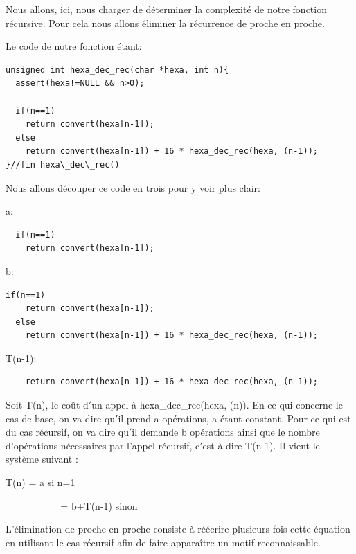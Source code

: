 \documentclass[a4paper, 11pt, oneside]{article}
\begin{document}
Nous allons, ici, nous charger de déterminer la complexité de notre fonction 
récursive. Pour cela nous allons éliminer la récurrence de proche en proche.

Le code de notre fonction étant:
\begin{lstlisting}
unsigned int hexa_dec_rec(char *hexa, int n){
  assert(hexa!=NULL && n>0);

  if(n==1)
    return convert(hexa[n-1]);
  else
    return convert(hexa[n-1]) + 16 * hexa_dec_rec(hexa, (n-1));
}//fin hexa\_dec\_rec()
\end{lstlisting}
\vspace{0.5cm}

Nous allons découper ce code en trois pour y voir plus clair:

\begin{center}
    a:
\end{center}
\begin{lstlisting}
  if(n==1)
    return convert(hexa[n-1]);
\end{lstlisting}

\begin{center}
    b:
\end{center}
\begin{lstlisting}
if(n==1)
    return convert(hexa[n-1]);
  else
    return convert(hexa[n-1]) + 16 * hexa_dec_rec(hexa, (n-1));
\end{lstlisting}

\begin{center}
    T(n-1):
\end{center}
\begin{lstlisting}
    return convert(hexa[n-1]) + 16 * hexa_dec_rec(hexa, (n-1));
\end{lstlisting}

Soit T(n), le coût d$'$un appel à hexa\_dec\_rec(hexa, (n)).
En ce qui concerne le cas de base, on va dire qu$'$il prend a opérations, a étant
constant. Pour ce qui est du cas récursif, on va dire qu$'$il demande b
opérations ainsi que le nombre d’opérations nécessaires par l’appel récursif,
c$'$est à dire T(n-1). Il vient le système suivant :

\begin{center}
T(n) = a si n=1
    
\textcolor{white}{----------------} = b+T(n-1) sinon
\end{center}

L’élimination de proche en proche consiste à réécrire plusieurs fois cette
équation en utilisant le cas récursif afin de faire apparaître un motif
reconnaissable.
\end{document}
